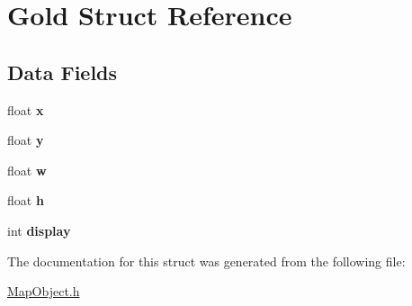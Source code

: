 \hypertarget{struct_gold}{}\section{Gold Struct Reference}
\label{struct_gold}
\subsection*{Data Fields}
\begin{DoxyCompactItemize}
\item 
\hypertarget{struct_gold_ad0da36b2558901e21e7a30f6c227a45e}{}float {\bfseries x}\label{struct_gold_ad0da36b2558901e21e7a30f6c227a45e}

\item 
\hypertarget{struct_gold_aa4f0d3eebc3c443f9be81bf48561a217}{}float {\bfseries y}\label{struct_gold_aa4f0d3eebc3c443f9be81bf48561a217}

\item 
\hypertarget{struct_gold_a56eca241e2896b9f57a79589e76fd24b}{}float {\bfseries w}\label{struct_gold_a56eca241e2896b9f57a79589e76fd24b}

\item 
\hypertarget{struct_gold_a85f2f1bd58b3b44ffdf3881823393959}{}float {\bfseries h}\label{struct_gold_a85f2f1bd58b3b44ffdf3881823393959}

\item 
\hypertarget{struct_gold_af36a76a97c2cc0ea7b1c0c25933934a9}{}int {\bfseries display}\label{struct_gold_af36a76a97c2cc0ea7b1c0c25933934a9}

\end{DoxyCompactItemize}


The documentation for this struct was generated from the following file\+:\begin{DoxyCompactItemize}
\item 
\hyperlink{_map_object_8h}{Map\+Object.\+h}\end{DoxyCompactItemize}
